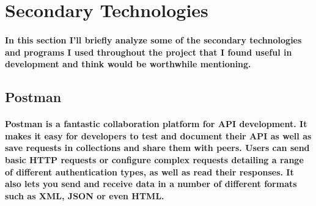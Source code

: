 
\section{Secondary Technologies}
\paragraph{In this section I'll briefly analyze some of the secondary technologies and programs I used throughout the project that I found useful in development and think would be worthwhile mentioning.}
\subsection{Postman}
\paragraph{Postman is a fantastic collaboration platform for API development. It makes it easy for developers to test and document their API as well as save requests in collections and share them with peers. Users can send basic HTTP requests or configure complex requests detailing a range of different authentication types, as well as read their responses. It also lets you send and receive data in a number of different formats such as XML, JSON or even HTML.}
